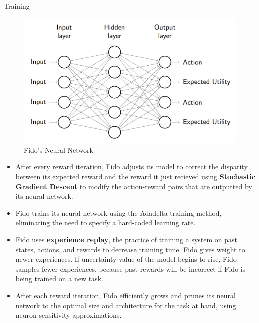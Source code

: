 \documentclass[final]{beamer}
\newlength{\onecolwid}
\newlength{\twocolwid}
\begin{document}
\begin{frame}[t]
\begin{columns}[t]
\begin{column}{\twocolwid}
\begin{columns}[t,totalwidth=\twocolwid]
\begin{column}{\onecolwid}
\begin{block}{Training}
	\begin{figure}
		\centering
		\includegraphics[width=.9\linewidth]{Figures/FidoNeuralNetworkRendered}
		\caption{Fido's Neural Network}
		\label{fig:feedforward}
	\end{figure}

	\vspace{-0.5cm}

	\begin{itemize}
		\item After every reward iteration, Fido adjusts its model to correct the disparity between its expected reward and the reward it just recieved using \textbf{Stochastic Gradient Descent} to modify the action-reward pairs that are outputted by its neural network.
		\item Fido trains its neural network using the Adadelta training method, eliminating the need to specify a hard-coded learning rate.
		\item Fido uses \textbf{experience replay}, the practice of training a system on past states, actions, and rewards to decrease training time. Fido gives weight to newer experiences. If uncertainty value of the model begins to rise, Fido samples fewer experiences, because past rewards will be incorrect if Fido is being trained on a new task.
		\item After each reward iteration, Fido efficiently grows and prunes its neural network to the optimal size and architecture for the task at hand, using neuron sensitivity approximations.
	\end{itemize}

\end{block}

\end{column}


\end{columns}
\end{column}
\end{columns}
\end{frame}
\end{document}
